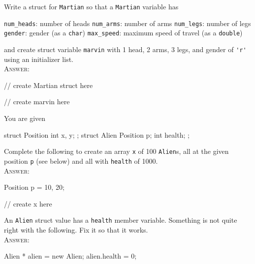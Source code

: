 

\renewcommand\AUTHOR{jdoe5@cougars.ccis.edu} %


\topmattertwo

\nextq
Write a struct for \verb!Martian! so that a \verb!Martian!
variable has
\begin{enumerate}[nosep]
\li \verb!num_heads!: number of heads
\li \verb!num_arms!: number of arms
\li \verb!num_legs!: number of legs
\li \verb!gender!: gender (as a \verb!char!)
\li \verb!max_speed!: maximum speed of travel (as a \verb!double!)
\end{enumerate}
and create struct variable \verb!marvin! with 1 head, 2 arms, 3 legs,
and gender of \verb!'r'! using an initializer list.
\\
\textsc{Answer:}\vspace{-2mm}
\begin{answercode}
// create Martian struct here

// create marvin here
\end{answercode}

\nextq
You are given
\begin{console}[fontsize=\footnotesize]
struct Position
{
    int x, y;
};
struct Alien
{
    Position p;
    int health;
};
\end{console}
Complete the following to create an array \verb!x! of 100 \verb!Alien!s,
all at the given position \verb!p! (see below) and all with \verb!health!
of 1000.
\\
\textsc{Answer:}\vspace{-2mm}
\begin{answercode}
Position p = {10, 20};

// create x here
\end{answercode}

\nextq
An \verb!Alien! struct value has a \verb!health! member variable.
Something is not quite right with the following. Fix it so that it works.
\\
\textsc{Answer:}\vspace{-2mm}
\begin{answercode}
Alien * alien = new Alien;
alien.health = 0; 
\end{answercode}

